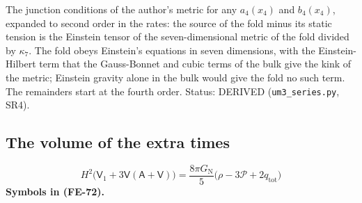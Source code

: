 \documentclass[
  10pt,
]{article}
\begin{document}
The junction conditions of the author's metric for any \(a_4(x_4)\) and
\(b_4(x_4)\), expanded to second order in the rates: the source of the
fold minus its static tension is the Einstein tensor of the
seven-dimensional metric of the fold divided by \(\kappa_7\). The fold
obeys Einstein's equations in seven dimensions, with the
Einstein-Hilbert term that the Gauss-Bonnet and cubic terms of the bulk
give the kink of the metric; Einstein gravity alone in the bulk would
give the fold no such term. The remainders start at the fourth order.
Status: DERIVED (\texttt{um3\_series.py}, SR4).

\hypertarget{the-volume-of-the-extra-times}{%
\subsection{The volume of the extra
times}\label{the-volume-of-the-extra-times}}

\[
H^2\big(\mathsf{V}_1 + 3\mathsf{V}(\mathsf{A} + \mathsf{V})\big) = \frac{8\pi G_{\mathrm{N}}}{5}\big(\rho - 3\mathcal{P} + 2q_{\mathrm{tot}}\big) \tag{FE-72}
\] \textbf{Symbols in (FE-72).}
\end{document}
